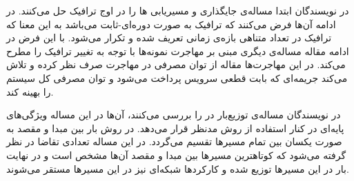 در \cite{Eramo2017}
نویسندگان ابتدا مساله‌ی جایگذاری و مسیریابی ها را
در اوج ترافیک حل می‌کنند. در ادامه آن‌ها فرض می‌کنند که ترافیک به صورت دوره‌ای-ثابت می‌باشد
به این معنا که ترافیک در تعداد متناهی بازه‌ی زمانی تعریف شده و تکرار می‌شود.
با این فرض در ادامه مقاله مساله‌ی دیگری مبنی بر مهاجرت نمونه‌ها با توجه به تغییر ترافیک را مطرح می‌کند.
در این مهاجرت‌ها مقاله از توان مصرفی در مهاجرت صرف نظر کرده و تلاش می‌کند جریمه‌ای که بابت قطعی سرویس پرداخت می‌شود
و توان مصرفی کل سیستم را بهینه کند.

در \cite{Pham2017}
نویسندگان مساله‌ی توزیع‌بار در  را بررسی می‌کنند،
آن‌ها در این مساله ویژگی‌های پایه‌ای  در کنار استفاده از
روش  مدنظر قرار می‌دهد.
در روش  بار بین مبدا و مقصد
به صورت یکسان بین تمام مسیرها تقسیم می‌گردد.
در این مساله تعدادی تقاضا در نظر گرفته می‌شود که کوتاهترین مسیرها بین مبدا و مقصد آن‌ها مشخص است
و در نهایت بار در این مسیرها توزیع شده و کارکردها شبکه‌ای نیز در این مسیرها مستقر می‌شوند.

